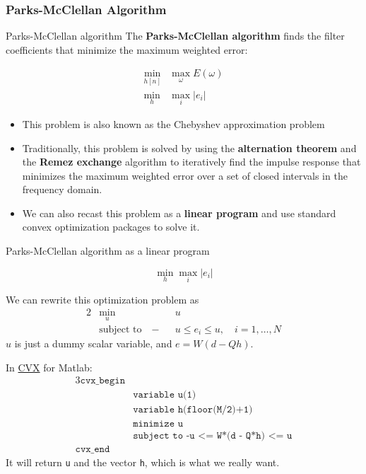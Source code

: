 \documentclass[10pt, handout]{beamer}
\begin{document}
\subsubsection{Parks-McClellan Algorithm}
\begin{frame}{Parks-McClellan algorithm} 
The \textbf{Parks-McClellan algorithm} finds the filter coefficients that minimize the maximum weighted error:

\begin{align*}
	\min_{h[n]} &\max_\omega E(\omega) \tag{min-max problem} \\
	\min_{h} &\max_i |e_i| \tag{in matrix notation}
\end{align*}

\begin{itemize}
	\item This problem is also known as the Chebyshev approximation problem
	\item Traditionally, this problem is solved by using the \textbf{alternation theorem} and the \textbf{Remez exchange} algorithm to iteratively find the impulse response that minimizes the maximum weighted error over a set of closed intervals in the frequency domain.
	\item We can also recast this problem as a \textbf{linear program} and use standard convex optimization packages to solve it.
\end{itemize}

\end{frame}

\begin{frame}{Parks-McClellan algorithm as a linear program} 

\begin{equation*}
\min_{h}\max_i |e_i| \tag{min-max problem}
\end{equation*}

We can rewrite this optimization problem as
\vspace{-0.1cm}
\begin{alignat*}{2}
&\min_{u} &&u  \\
&\text{subject to} \quad -&&u \leq e_i \leq u, \quad i = 1, \ldots, N \tag{equivalent linear program}
\end{alignat*}
$u$ is just a dummy scalar variable, and $e = W(d - Qh)$.
\vspace{0.2cm}

In \href{http://cvxr.com/cvx/}{CVX} for Matlab:
\begin{alignat*}{3}
\texttt{cvx\_begin} \\
	&\texttt{variable u(1)} \\
	&\texttt{variable h(floor(M/2)+1)} \\
	&\texttt{minimize u}\\
	&\texttt{subject to -u <= W*(d - Q*h) <= u} \\
\texttt{cvx\_end}
\end{alignat*}
It will return \texttt{u} and the vector \texttt{h}, which is what we really want. \end{frame}
\end{document}
